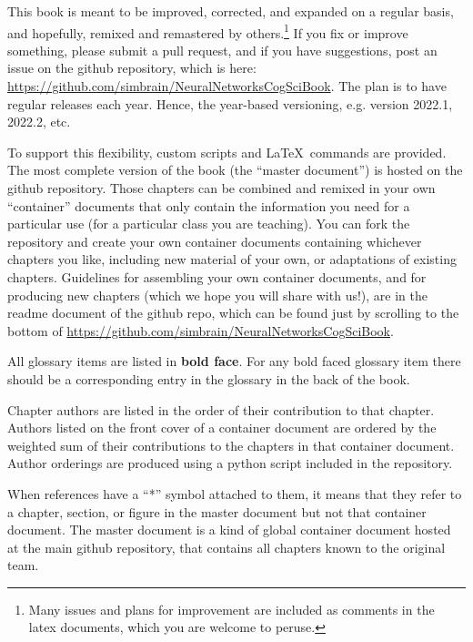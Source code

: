 This book is meant to be improved, corrected, and expanded on a regular basis, and hopefully, remixed and remastered by others.\footnote{Many issues and plans for improvement are included as comments in the latex documents, which you are welcome to peruse.} If you fix or improve something, please submit a pull request, and if you have suggestions, post an issue on the github repository, which is here: \url{https://github.com/simbrain/NeuralNetworksCogSciBook}. The plan is to have regular releases each year. Hence, the year-based versioning, e.g. version 2022.1, 2022.2, etc.

To support this flexibility, custom scripts and \LaTeX~commands are provided. The most complete version of the book (the ``master document'') is hosted on the github repository. Those chapters can be combined and remixed in your own ``container'' documents that only contain the information you need for a particular use (\eg for a particular class you are teaching). You can fork the repository and  create your own container documents containing whichever chapters you like, including new material of your own, or adaptations of existing chapters. Guidelines for assembling your own container documents, and for producing new chapters (which we hope you will share with us!), are in the readme document of the github repo, which can be found just by scrolling to the bottom of \url{https://github.com/simbrain/NeuralNetworksCogSciBook}.

All glossary items are listed in \textbf{bold face}. For any bold faced glossary item there should be a corresponding entry in the glossary in the back of the book.

Chapter authors are listed in the order of their contribution to that chapter. Authors listed on the front cover of a container document are ordered by the weighted sum of their contributions to the chapters in that container document. Author orderings are produced using a python script included in the repository.

When references have a ``*'' symbol attached to them, it means that they refer to a chapter, section, or figure in the master document but not that container document. The master document is a kind of global container document hosted at the main github repository, that contains all chapters known to the original team.

